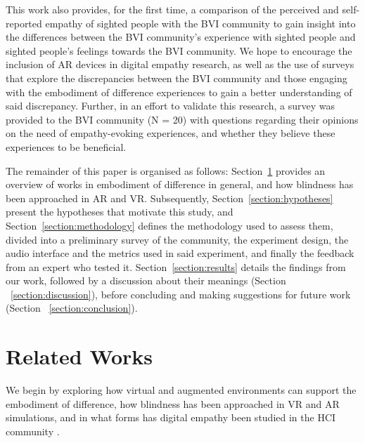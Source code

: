 \documentclass{vgtc}                          %
\begin{document}
This work also provides, for the first time, a comparison of the perceived and self-reported empathy of sighted people with the BVI community to gain insight into the differences between the BVI community's experience with sighted people and sighted people's feelings towards the BVI community. We hope to encourage the inclusion of AR devices in digital empathy research, as well as the use of surveys that explore the discrepancies between the BVI community and those engaging with the embodiment of difference experiences to gain a better understanding of said discrepancy. Further, in an effort to validate this research, a survey was provided to the BVI community (N = 20) with questions regarding their opinions on the need of empathy-evoking experiences, and whether they believe these experiences to be beneficial. 

The remainder of this paper is organised as follows: Section~\ref{section:relatedworks} provides an overview of works in embodiment of difference in general, and how blindness has been approached in AR and VR. Subsequently, Section~\ref{section:hypotheses} present the hypotheses that motivate this study, and Section~\ref{section:methodology} defines the methodology used to assess them, divided into a preliminary survey of the community, the experiment design, the audio interface and the metrics used in said experiment, and finally the feedback from an expert who tested it. Section~\ref{section:results} details the findings from our work, followed by a discussion about their meanings (Section ~\ref{section:discussion}), before concluding and making suggestions for future work (Section ~\ref{section:conclusion}).

\section{Related Works}
\label{section:relatedworks}

We begin by exploring how virtual and augmented environments can support the embodiment of difference, how blindness has been approached in VR and AR simulations, and in what forms has digital empathy been studied in the HCI community \cite{empathyLitReview}.
\end{document}
